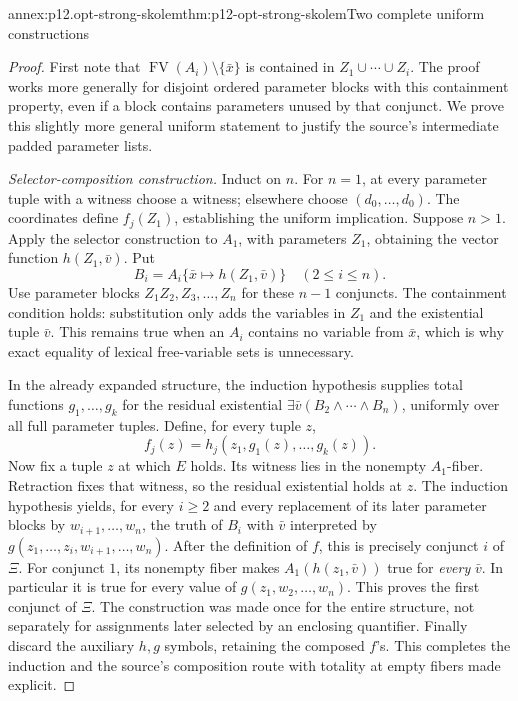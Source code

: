 \begin{annexitem}{annex:p12.opt-strong-skolem}{thm:p12-opt-strong-skolem}{Two complete uniform constructions}
\begin{proof}
First note that \(\operatorname{FV}(A_i)\setminus\{\bar x\}\)
is contained in \(Z_1\cup\cdots\cup Z_i\).
The proof works more generally for disjoint ordered parameter blocks
with this containment property, even if a block contains parameters
unused by that conjunct. We prove this slightly more general uniform
statement to justify the source's intermediate padded parameter lists.

\emph{Selector-composition construction.}
Induct on \(n\). For \(n=1\), at every parameter tuple with a
witness choose a witness; elsewhere choose \((d_0,\ldots,d_0)\).
The coordinates define \(f_j(Z_1)\), establishing the uniform
implication. Suppose \(n>1\). Apply the selector construction
to \(A_1\), with parameters \(Z_1\), obtaining the vector function
\(h(Z_1,\bar v)\). Put
\[
 B_i=A_i\{\bar x\mapsto h(Z_1,\bar v)\}\quad(2\le i\le n).
\]
Use parameter blocks \(Z_1Z_2,Z_3,\ldots,Z_n\) for these \(n-1\)
conjuncts. The containment condition holds: substitution only adds
the variables in \(Z_1\) and the existential tuple \(\bar v\).
This remains true when an \(A_i\) contains no variable from
\(\bar x\), which is why exact equality of lexical free-variable
sets is unnecessary.

In the already expanded structure, the induction hypothesis supplies
total functions \(g_1,\ldots,g_k\) for the residual existential
\(\exists\bar v(B_2\land\cdots\land B_n)\), uniformly over
all full parameter tuples. Define, for every tuple \(z\),
\[
 f_j(z)=h_j(z_1,g_1(z),\ldots,g_k(z)).
\]
Now fix a tuple \(z\) at which \(E\) holds. Its witness lies in
the nonempty \(A_1\)-fiber. Retraction fixes that witness, so the
residual existential holds at \(z\).
The induction hypothesis yields, for every \(i\ge2\) and every
replacement of its later parameter blocks by \(w_{i+1},\ldots,w_n\),
the truth of \(B_i\) with \(\bar v\) interpreted by
\(g(z_1,\ldots,z_i,w_{i+1},\ldots,w_n)\).
After the definition of \(f\), this is precisely conjunct \(i\)
of \(\Xi\). For conjunct \(1\), its nonempty fiber makes
\(A_1(h(z_1,\bar v))\) true for \emph{every} \(\bar v\).
In particular it is true for every value of
\(g(z_1,w_2,\ldots,w_n)\). This proves the first conjunct of
\(\Xi\). The construction was made once for the entire structure,
not separately for assignments later selected by an enclosing
quantifier. Finally discard the auxiliary \(h,g\) symbols, retaining
the composed \(f\)'s. This completes the induction and the source's
composition route with totality at empty fibers made explicit.


\end{proof}
\end{annexitem}
